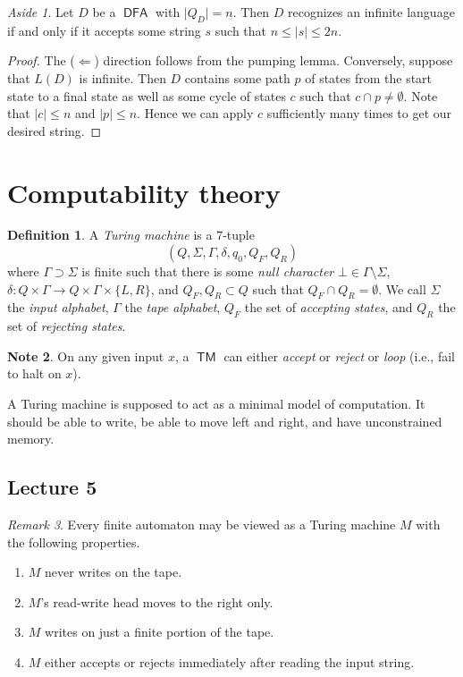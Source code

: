 \documentclass[10pt,letterpaper,cm]{nupset}
\theoremstyle{definition}
\newtheorem{definition}{Definition}[subsection]
\newtheorem{note}[definition]{Note}
\theoremstyle{theorem}
\theoremstyle{remark}
\newtheorem{remark}[definition]{Remark}
\newtheorem*{aside}{Aside}
\newcommand{\1}{\mathbf{1}}
\newcommand{\0}{\vec 0}
\DeclareMathOperator{\TM}{\mathsf{TM}}
\DeclareMathOperator{\DFA}{\mathsf{DFA}}
\begin{document}
\begin{aside}
Let $D$ be a $\DFA$ with $\lvert{Q_D}\rvert =n$. Then $D$ recognizes an infinite language if and only if it accepts some string $s$ such that $n\leq \lvert{s}\rvert \leq 2n$.
\end{aside}
\begin{proof}
The ($\Longleftarrow$) direction follows from the pumping lemma. Conversely, suppose that $L(D)$ is infinite. Then $D$ contains some path $p$ of states from the start state to a final state as well as some cycle of states $c$ such that $c \cap p \ne \emptyset$. Note that $\lvert{c}\rvert \leq n$ and $\lvert{p}\rvert \leq n$. Hence we can apply $c$ sufficiently many times to get our desired string.
\end{proof}

\section{Computability theory}

\begin{definition}
A \textit{Turing machine} is a $7$-tuple $$\left(Q, \Sigma, \Gamma, \delta, q_0, Q_F, Q_R\right)$$ where $\Gamma \supset \Sigma$ is finite such that there is some \textit{null character} $\bot \in \Gamma \setminus \Sigma$, $\delta : Q\times \Gamma \to Q \times \Gamma \times \{L, R\}$, and $Q_F, Q_R \subset Q$ such that $Q_F \cap Q_R = \emptyset$. We call $\Sigma$ the \textit{input alphabet}, $\Gamma$ the \textit{tape alphabet}, $Q_F$ the set of \textit{accepting states}, and $Q_R$ the set of \textit{rejecting states}.
\end{definition}

\begin{note}
On any given input $x$, a $\TM$ can either \textit{accept} or \textit{reject} or \textit{loop} (i.e., fail to halt on $x$).
\end{note}

\smallskip

A Turing machine is supposed to act as a minimal model of computation. It should be able to write, be able to move left and right, and have unconstrained memory.


\subsection{Lecture 5}

\begin{remark}
Every finite automaton may be viewed as a Turing machine $M$ with the following properties. 
\begin{enumerate}[label=(\alph*)]
\item $M$ never writes on the tape.
\item $M$'s read-write head moves to the right only.
\item $M$ writes on just a finite portion of the tape.
\item $M$ either accepts or rejects immediately after reading the input string. 
\end{enumerate}
\end{remark}
\end{document}
